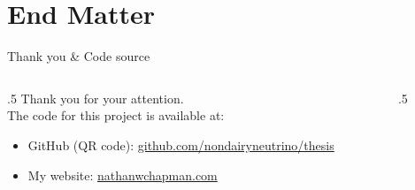 \documentclass[aspectratio=169]{beamer}
\begin{document}
\section{End Matter}
    
    \begin{frame}{Thank you \& Code source}
    \begin{columns}[onlytextwidth]
        \begin{column}{.5\textwidth}
            Thank you for your attention.
            \vspace*{0.1\textheight} \\
            The code for this project is available at:
            \begin{itemize}
                \item GitHub (QR code): \url{github.com/nondairyneutrino/thesis}
                \item My website: \url{nathanwchapman.com}
            \end{itemize}
        \end{column}
        \begin{column}{.5\textwidth}
            \centering
        \end{column}
    \end{columns}
    \end{frame}
    
    \begin{frame}[allowframebreaks,t]{\bibname}
        \AtNextBibliography{\footnotesize}%
            \nocite{*}
        \printbibliography
    \end{frame}
\end{document}
